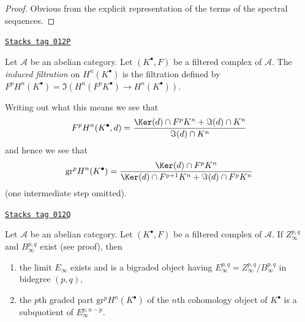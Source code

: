\begin{proof}
Obvious from the explicit representation of the terms of the
spectral sequences.
\end{proof}

\begin{definition}
\label{homology-definition-filtration-cohomology-filtered-complex}
\href{https://stacks.math.columbia.edu/tag/012P}{\texttt{Stacks tag 012P}}

Let $\mathcal{A}$ be an abelian category.
Let $(K^\bullet, F)$ be a filtered complex of $\mathcal{A}$.
The {\it induced filtration} on $H^n(K^\bullet)$ is the filtration defined
by $F^pH^n(K^\bullet) = \Im(H^n(F^pK^\bullet) \to H^n(K^\bullet))$.
\end{definition}

Writing out what this means we see that
\begin{equation}
\label{equation-filtration-cohomology}
F^pH^n(K^\bullet, d) =
\frac{\Ker(d) \cap F^pK^n + \Im(d) \cap K^n}{\Im(d) \cap K^n}
\end{equation}
and hence we see that
\begin{equation}
\label{equation-graded-cohomology}
\text{gr}^p H^n(K^\bullet) =
\frac{\Ker(d) \cap F^pK^n}{\Ker(d) \cap F^{p + 1}K^n + \Im(d) \cap F^pK^n}
\end{equation}
(one intermediate step omitted).

\begin{lemma}
\label{homology-lemma-compute-cohomology-filtered-complex}
\href{https://stacks.math.columbia.edu/tag/012Q}{\texttt{Stacks tag 012Q}}

Let $\mathcal{A}$ be an abelian category. Let $(K^\bullet, F)$ be a filtered
complex of $\mathcal{A}$. If $Z_\infty^{p, q}$ and $B_\infty^{p, q}$ exist
(see proof), then
\begin{enumerate}
\item the limit $E_\infty$ exists and is a bigraded object having
$E_\infty^{p, q} = Z_\infty^{p, q}/B_\infty^{p, q}$ in bidegree $(p, q)$,
\item the $p$th graded part $\text{gr}^pH^n(K^\bullet)$ of the
$n$th cohomology object of $K^\bullet$ is a subquotient of
$E_\infty^{p, n - p}$.
\end{enumerate}
\end{lemma}

